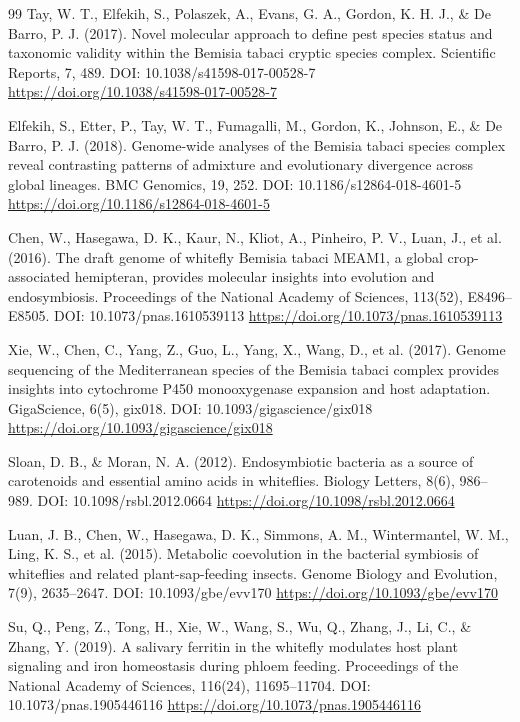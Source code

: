 \documentclass[10pt,letterpaper]{article}
\begin{document}
\begin{thebibliography}{99}
 Tay, W. T., Elfekih, S., Polaszek, A., Evans, G. A., Gordon, K. H. J., \& De Barro, P. J. (2017). Novel molecular approach to define pest species status and taxonomic validity within the Bemisia tabaci cryptic species complex. Scientific Reports, 7, 489. DOI: 10.1038/s41598-017-00528-7 \url{https://doi.org/10.1038/s41598-017-00528-7}

 Elfekih, S., Etter, P., Tay, W. T., Fumagalli, M., Gordon, K., Johnson, E., \& De Barro, P. J. (2018). Genome-wide analyses of the Bemisia tabaci species complex reveal contrasting patterns of admixture and evolutionary divergence across global lineages. BMC Genomics, 19, 252. DOI: 10.1186/s12864-018-4601-5 \url{https://doi.org/10.1186/s12864-018-4601-5}

 Chen, W., Hasegawa, D. K., Kaur, N., Kliot, A., Pinheiro, P. V., Luan, J., et al. (2016). The draft genome of whitefly Bemisia tabaci MEAM1, a global crop-associated hemipteran, provides molecular insights into evolution and endosymbiosis. Proceedings of the National Academy of Sciences, 113(52), E8496--E8505. DOI: 10.1073/pnas.1610539113 \url{https://doi.org/10.1073/pnas.1610539113}

 Xie, W., Chen, C., Yang, Z., Guo, L., Yang, X., Wang, D., et al. (2017). Genome sequencing of the Mediterranean species of the Bemisia tabaci complex provides insights into cytochrome P450 monooxygenase expansion and host adaptation. GigaScience, 6(5), gix018. DOI: 10.1093/gigascience/gix018 \url{https://doi.org/10.1093/gigascience/gix018}

 Sloan, D. B., \& Moran, N. A. (2012). Endosymbiotic bacteria as a source of carotenoids and essential amino acids in whiteflies. Biology Letters, 8(6), 986--989. DOI: 10.1098/rsbl.2012.0664 \url{https://doi.org/10.1098/rsbl.2012.0664}

 Luan, J. B., Chen, W., Hasegawa, D. K., Simmons, A. M., Wintermantel, W. M., Ling, K. S., et al. (2015). Metabolic coevolution in the bacterial symbiosis of whiteflies and related plant-sap-feeding insects. Genome Biology and Evolution, 7(9), 2635--2647. DOI: 10.1093/gbe/evv170 \url{https://doi.org/10.1093/gbe/evv170}

 Su, Q., Peng, Z., Tong, H., Xie, W., Wang, S., Wu, Q., Zhang, J., Li, C., \& Zhang, Y. (2019). A salivary ferritin in the whitefly modulates host plant signaling and iron homeostasis during phloem feeding. Proceedings of the National Academy of Sciences, 116(24), 11695--11704. DOI: 10.1073/pnas.1905446116 \url{https://doi.org/10.1073/pnas.1905446116}


\end{thebibliography}
\end{document}
